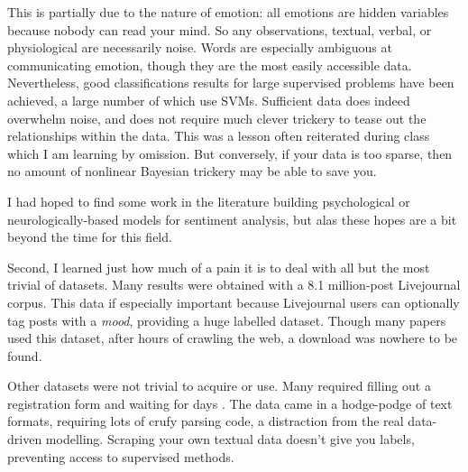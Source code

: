 \documentclass{article}
\begin{document}
This is partially due to the nature of emotion: all emotions
are hidden variables because nobody can read your mind. So any
observations, textual, verbal, or physiological are necessarily
noise. Words are especially ambiguous at communicating emotion,
though they are the most easily accessible data. Nevertheless, good
classifications results for large supervised problems have been
achieved, a large number of which use SVMs. Sufficient data does
indeed overwhelm noise, and does not require much clever trickery
to tease out the relationships within the data. This was a lesson
often reiterated during class which I am learning by omission. But
conversely, if your data is too sparse, then no amount of nonlinear
Bayesian trickery may be able to save you.

I had hoped to find some work in the literature building psychological
or neurologically-based models for sentiment analysis, but alas
these hopes are a bit beyond the time for this field.

Second, I learned just how much of a pain it is to deal with all
but the most trivial of datasets. Many results were obtained with
a 8.1 million-post Livejournal corpus. This data if especially
important because Livejournal users can optionally tag posts with
a \emph{mood}, providing a huge labelled dataset\citep{mischne2005}.
Though many papers used this dataset, after hours of crawling the
web, a download was nowhere to be found.

Other datasets were not trivial to acquire or use. Many required
filling out a registration form and waiting for days \citep{baccianella10}.
The data came in a hodge-podge of text formats, requiring
lots of crufy parsing code, a distraction from the real
data-driven modelling. Scraping your own textual data doesn't
give you labels, preventing access to supervised methods.

\begin{small}

 
\end{small}
\end{document}
